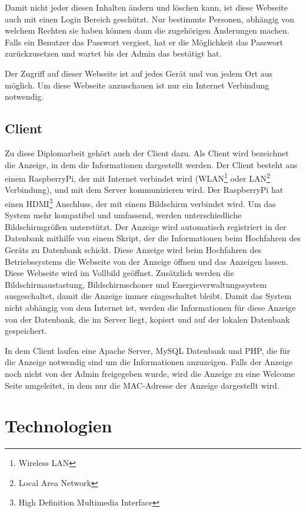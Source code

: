 Damit nicht jeder diesen Inhalten \"{a}ndern und l\"{o}schen kann, ist diese Webseite auch mit einen Login Bereich gesch\"{u}tzt. Nur bestimmte Personen, abh\"{a}ngig von welchem Rechten sie haben k\"{o}nnen dann die zugeh\"{o}rigen \"{A}nderungen machen. Falls ein Benutzer das Passwort vergisst, hat er die M\"{o}glichkeit das Passwort zur\"{u}ckzusetzen und wartet bis der Admin das best\"{a}tigt hat.


Der Zugriff auf dieser Webseite ist auf jedes Ger\"{a}t und von jedem Ort aus m\"{o}glich. Um diese Webseite anzuschauen ist nur ein Internet Verbindung notwendig.

\subsection{Client}

Zu diese Diplomarbeit geh\"{o}rt auch der Client dazu. Als Client wird bezeichnet die Anzeige, in dem die Informationen dargestellt werden. Der Client besteht aus einem RaspberryPi, der mit Internet verbindet wird (WLAN\footnote{Wireless LAN} oder LAN\footnote{Local Area Network} Verbindung), und mit dem Server kommunizieren wird. Der RaspberryPi hat einen HDMI\footnote{High Definition Multimedia Interface} Anschluss, der mit einem Bildschirm verbindet wird. Um das System mehr kompatibel und umfassend, werden unterschiedliche Bildschirmgr\"{o}\ss{}en unterst\"{u}tzt. Der Anzeige wird automatisch registriert in der Datenbank mithilfe von einem Skript, der die Informationen beim Hochfahren des Ger\"{a}ts zu Datenbank schickt. Diese Anzeige wird beim Hochfahren des Betriebssystems die Webseite von der Anzeige \"{o}ffnen und das Anzeigen lassen. Diese Webseite wird im Vollbild ge\"{o}ffnet. Zus\"{a}tzlich werden die Bildschirmaustastung, Bildschirmschoner und Energieverwaltungssystem ausgeschaltet, damit die Anzeige immer eingeschaltet bleibt. Damit das System nicht abh\"{a}ngig von dem Internet ist, werden die Informationen f\"{u}r diese Anzeige von der Datenbank, die im Server liegt, kopiert und auf der lokalen Datenbank gespeichert. 

In dem Client laufen eine Apache Server, MySQL Datenbank und PHP, die f\"{u}r die Anzeige notwendig sind um die Informationen anzuzeigen. Falls der Anzeige noch nicht von der Admin freigegeben wurde, wird die Anzeige zu eine Welcome Seite umgeleitet, in dem nur die MAC-Adresse der Anzeige dargestellt wird.



\section{Technologien}

